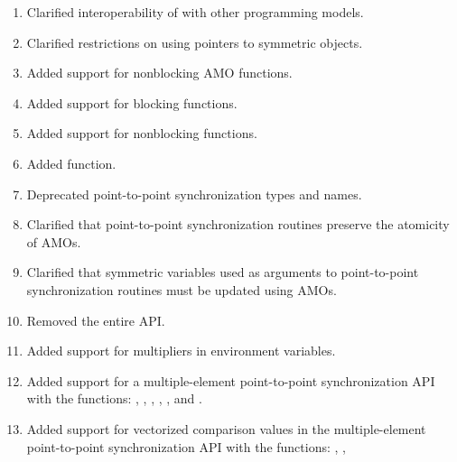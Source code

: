 \begin{enumerate}
{  subsec:shmem_broadcast,
  subsec:shmem_collect,
  subsec:shmem_reductions}%
%
\item Clarified interoperability of \openshmem with other programming models.
%
%
\item Clarified restrictions on using pointers to symmetric objects.
%
%
\item Added support for nonblocking \ac{AMO} functions.
%
%
\item Added support for blocking  functions.
%
%
\item Added support for nonblocking  functions.
%
%
\item Added  function.
%
%
\item Deprecated point-to-point synchronization types and names.
%
%
\item Clarified that point-to-point synchronization routines preserve the
  atomicity of \openshmem \acp{AMO}.
%
%
\item Clarified that symmetric variables used as  arguments to
  point-to-point synchronization routines must be updated using \openshmem
  \acp{AMO}.
%
%
\item Removed the entire \openshmem \Fortran \ac{API}.
%
%
\item Added support for multipliers in 
environment variables.
%
%
\item Added support for a multiple-element point-to-point synchronization \ac{API} with
  the functions: , ,
  , ,
  , and .
%
%
\item Added support for vectorized comparison values in the multiple-element
  point-to-point synchronization \ac{API} with the functions:
  , ,

\end{enumerate}
